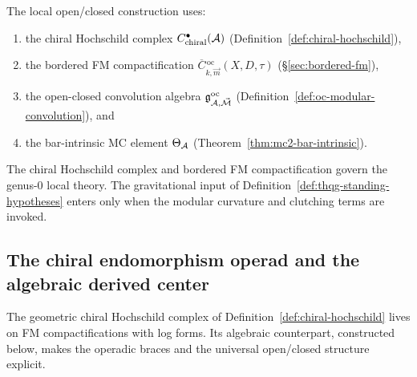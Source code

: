 \begin{remark}
\label{rem:thqg-oc-dependency-spine}
The local open/closed construction uses:
\begin{enumerate}[label=\textup{(\roman*)}]
\item the chiral Hochschild complex
 $C^\bullet_{\mathrm{chiral}}(\mathcal{A})$
 (Definition~\ref{def:chiral-hochschild}),
\item the bordered FM compactification
 $\overline{C}{}^{\,\mathrm{oc}}_{k,\vec{m}}(X, D, \tau)$
 (\S\ref{sec:bordered-fm}),
\item the open-closed convolution algebra
 $\mathfrak{g}^{\mathrm{oc}}_{\mathcal{A}, \vec{\mathcal{M}}}$
 (Definition~\ref{def:oc-modular-convolution}), and
\item the bar-intrinsic MC element $\Theta_{\mathcal{A}}$
 (Theorem~\ref{thm:mc2-bar-intrinsic}).
\end{enumerate}
The chiral Hochschild complex and bordered FM compactification
govern the genus-$0$ local theory. The gravitational input of
Definition~\ref{def:thqg-standing-hypotheses} enters only when
the modular curvature and clutching terms are invoked.
\end{remark}

\subsection{The chiral endomorphism operad and the algebraic derived center}
\label{subsec:thqg-chiral-endomorphism-operad}

The geometric chiral Hochschild complex of
Definition~\ref{def:chiral-hochschild} lives on FM
compactifications with log forms. Its algebraic
counterpart, constructed below, makes the operadic braces and the universal
open/closed structure explicit.

